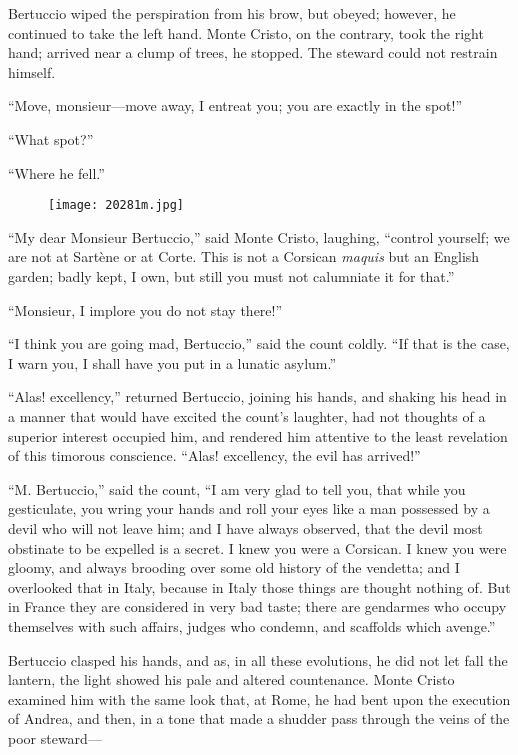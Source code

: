 Bertuccio wiped the perspiration from his brow, but obeyed; however, he
continued to take the left hand. Monte Cristo, on the contrary, took
the right hand; arrived near a clump of trees, he stopped. The steward
could not restrain himself.

“Move, monsieur—move away, I entreat you; you are exactly in the spot!”

“What spot?”

“Where he fell.”

\begin{figure}[ht]
\texttt{[image: 20281m.jpg]}
\end{figure}

“My dear Monsieur Bertuccio,” said Monte Cristo, laughing, “control
yourself; we are not at Sartène or at Corte. This is not a Corsican
\textit{maquis} but an English garden; badly kept, I own, but still you must
not calumniate it for that.”

“Monsieur, I implore you do not stay there!”

“I think you are going mad, Bertuccio,” said the count coldly. “If that
is the case, I warn you, I shall have you put in a lunatic asylum.”

“Alas! excellency,” returned Bertuccio, joining his hands, and shaking
his head in a manner that would have excited the count’s laughter, had
not thoughts of a superior interest occupied him, and rendered him
attentive to the least revelation of this timorous conscience. “Alas!
excellency, the evil has arrived!”

“M. Bertuccio,” said the count, “I am very glad to tell you, that while
you gesticulate, you wring your hands and roll your eyes like a man
possessed by a devil who will not leave him; and I have always
observed, that the devil most obstinate to be expelled is a secret. I
knew you were a Corsican. I knew you were gloomy, and always brooding
over some old history of the vendetta; and I overlooked that in Italy,
because in Italy those things are thought nothing of. But in France
they are considered in very bad taste; there are gendarmes who occupy
themselves with such affairs, judges who condemn, and scaffolds which
avenge.”

Bertuccio clasped his hands, and as, in all these evolutions, he did
not let fall the lantern, the light showed his pale and altered
countenance. Monte Cristo examined him with the same look that, at
Rome, he had bent upon the execution of Andrea, and then, in a tone
that made a shudder pass through the veins of the poor steward—

